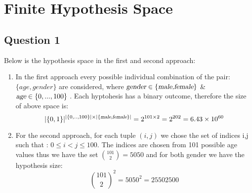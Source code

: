 \documentclass{article}
\title{
\vspace{1in}
\textmd{\textbf{Machine Learning - Assignment 4} \\
\author{Christoffer Thrysøe - dfv107}}}
\begin{document}
\maketitle
{}
\section{Finite Hypothesis Space}
\subsection{Question 1}
Below is the hypothesis space in the first and second approach:
\begin{enumerate}
\item{In the first approach every possible individual combination of the pair: $ \lbrace age,gender \rbrace$ are considered, where $\textsl{gender} \in \lbrace \textsl{male,female} \rbrace$ \& $\textsl{age} \in \lbrace 0,...,100\rbrace$ }. Each hyptohesis has a binary outcome, therefore the size of above space is:
\begin{equation*}
|\lbrace 0 ,1 \rbrace |^{|\lbrace 0,..,100\rbrace| \times |\lbrace \textsl{male,female} \rbrace|} =
2^{101 \times 2 } = 2^{202} = 6.43 \times 10^{60}
\end{equation*}
\item{
For the second approach, for each tuple $(i,j)$ we chose the set of indices i,j such that : $ 0 \leq i < j \leq 100$. The indices are chosen from 101 possible age values thus we have the set $\binom{101}{2} = 5050$ and for both gender we have the hypothesis size:
\begin{equation*}
\binom{101}{2}^2 = 5050 ^2 = 25502500
\end{equation*}
}
\end{enumerate}
\end{document}

